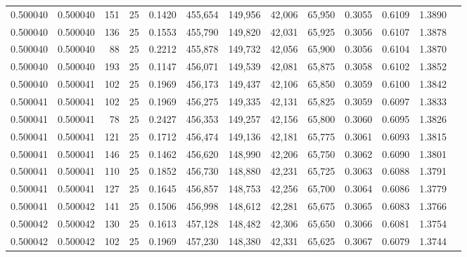 \begin{tabular}{rrrrrrrrrrrrr}
0.500040 & 0.500040 &   151 &  25 &                                     0.1420 & 455,654 & 149,956 &  42,006 &  65,950 & 0.3055 & 0.6109 & 1.3890 \\
0.500040 & 0.500040 &   136 &  25 &                                     0.1553 & 455,790 & 149,820 &  42,031 &  65,925 & 0.3056 & 0.6107 & 1.3878 \\
0.500040 & 0.500040 &    88 &  25 &                                     0.2212 & 455,878 & 149,732 &  42,056 &  65,900 & 0.3056 & 0.6104 & 1.3870 \\
0.500040 & 0.500040 &   193 &  25 &                                     0.1147 & 456,071 & 149,539 &  42,081 &  65,875 & 0.3058 & 0.6102 & 1.3852 \\
0.500040 & 0.500041 &   102 &  25 &                                     0.1969 & 456,173 & 149,437 &  42,106 &  65,850 & 0.3059 & 0.6100 & 1.3842 \\
0.500041 & 0.500041 &   102 &  25 &                                     0.1969 & 456,275 & 149,335 &  42,131 &  65,825 & 0.3059 & 0.6097 & 1.3833 \\
0.500041 & 0.500041 &    78 &  25 &                                     0.2427 & 456,353 & 149,257 &  42,156 &  65,800 & 0.3060 & 0.6095 & 1.3826 \\
0.500041 & 0.500041 &   121 &  25 &                                     0.1712 & 456,474 & 149,136 &  42,181 &  65,775 & 0.3061 & 0.6093 & 1.3815 \\
0.500041 & 0.500041 &   146 &  25 &                                     0.1462 & 456,620 & 148,990 &  42,206 &  65,750 & 0.3062 & 0.6090 & 1.3801 \\
0.500041 & 0.500041 &   110 &  25 &                                     0.1852 & 456,730 & 148,880 &  42,231 &  65,725 & 0.3063 & 0.6088 & 1.3791 \\
0.500041 & 0.500041 &   127 &  25 &                                     0.1645 & 456,857 & 148,753 &  42,256 &  65,700 & 0.3064 & 0.6086 & 1.3779 \\
0.500041 & 0.500042 &   141 &  25 &                                     0.1506 & 456,998 & 148,612 &  42,281 &  65,675 & 0.3065 & 0.6083 & 1.3766 \\
0.500042 & 0.500042 &   130 &  25 &                                     0.1613 & 457,128 & 148,482 &  42,306 &  65,650 & 0.3066 & 0.6081 & 1.3754 \\
0.500042 & 0.500042 &   102 &  25 &                                     0.1969 & 457,230 & 148,380 &  42,331 &  65,625 & 0.3067 & 0.6079 & 1.3744 \\

\end{tabular}
